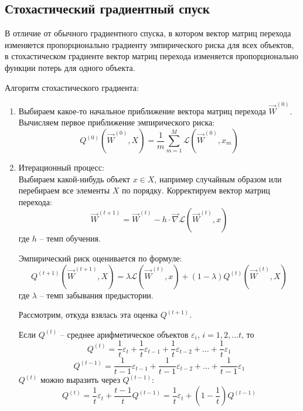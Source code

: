 \subsection{Стохастический градиентный спуск}

В отличие от обычного градиентного спуска, в котором вектор матриц перехода изменяется пропорционально градиенту эмпирического риска для всех объектов, в стохастическом градиенте вектор матриц перехода изменяется пропорционально функции потерь для одного объекта.

Алгоритм стохастического градиента:

\begin{enumerate}
	\item Выбираем какое-то начальное приближение вектора матриц перехода $\overrightarrow{W}^{(0)}$. Вычисляем первое приближение эмпирического риска:
	      $$
		      Q^{(0)}(\overrightarrow{W}^{(0)}, X) = \frac{1}{m} \sum\limits_{m = 1}^{M} \mathcal{L} (\overrightarrow{W}^{(0)}, x_m)
	      $$

	\item Итерационный процесс: \\
	      Выбираем какой-нибудь объект $x \in X$, например случайным образом или перебираем все элементы $X$ по порядку. Корректируем вектор матриц перехода:
	      $$
		      \overrightarrow{W}^{(t+1)} = \overrightarrow{W}^{(t)} - h \cdot \overrightarrow{\nabla} \mathcal{L} (\overrightarrow{W}^{(t)}, x)
	      $$
	      где $h$ -- темп обучения.

	      Эмпирический риск оценивается по формуле:
	      $$
		      Q^{(t+1)}(\overrightarrow{W}^{(t+1)}, X) = \lambda \mathcal{L} (\overrightarrow{W}^{(t)}, x) + (1-\lambda)  Q^{(t)}(\overrightarrow{W}^{(t)}, X)
	      $$
	      где $\lambda$ -- темп забывания предыстории.

	      Рассмотрим, откуда взялась эта оценка $Q^{(t+1)}$.

	      Если $Q^{(t)}$ -- среднее арифметическое объектов $\varepsilon_i$, $i = 1, 2, \dots t$, то
	      $$
		      Q^{(t)} = \frac{1}{t} \varepsilon_t + \frac{1}{t} \varepsilon_{t-1} + \frac{1}{t} \varepsilon_{t-2} + \dots + \frac{1}{t} \varepsilon_{1}
	      $$
	      $$
		      Q^{(t - 1)} = \frac{1}{t-1} \varepsilon_{t-1} + \frac{1}{t-1} \varepsilon_{t-2} + \dots + \frac{1}{t-1} \varepsilon_{1}
	      $$
	      $Q^{(t)}$ можно выразить через $Q^{(t-1)}$:
	      $$
		      Q^{(t)} = \frac{1}{t} \varepsilon_t + \frac{t-1}{t} Q^{(t-1)} = \frac{1}{t} \varepsilon_t + (1 - \frac{1}{t}) Q^{(t-1)}
	      $$


\end{enumerate}
